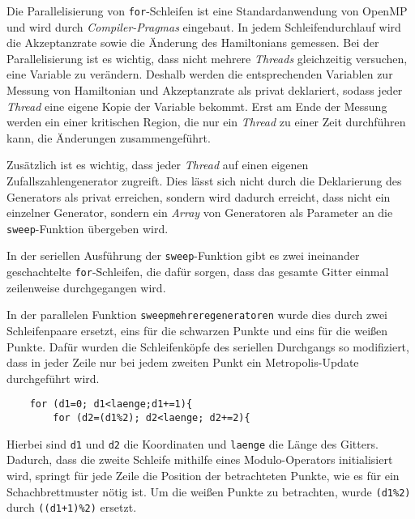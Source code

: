 	Die Parallelisierung von \texttt{for}-Schleifen ist eine Standardanwendung von OpenMP und wird durch \textit{Compiler-Pragmas} eingebaut. In jedem Schleifendurchlauf wird die Akzeptanzrate sowie die Änderung des Hamiltonians gemessen. Bei der Parallelisierung ist es wichtig, dass nicht mehrere \textit{Threads} gleichzeitig versuchen, eine Variable zu verändern. Deshalb werden die entsprechenden Variablen zur Messung von Hamiltonian und Akzeptanzrate als privat deklariert, sodass jeder \textit{Thread} eine eigene Kopie der Variable bekommt. Erst am Ende der Messung werden ein einer kritischen Region, die nur ein \textit{Thread} zu einer Zeit durchführen kann, die Änderungen zusammengeführt. 	%
	
	
	Zusätzlich ist es wichtig, dass jeder \textit{Thread} auf einen eigenen Zufallszahlengenerator zugreift. Dies lässt sich nicht durch die Deklarierung des Generators als privat erreichen, sondern wird dadurch erreicht, dass nicht ein einzelner Generator, sondern ein \textit{Array} von Generatoren als Parameter an die \texttt{sweep}-Funktion übergeben wird.
	
	In der seriellen Ausführung der \texttt{sweep}-Funktion gibt es zwei ineinander geschachtelte \texttt{for}-Schleifen, die dafür sorgen, dass das gesamte Gitter einmal zeilenweise durchgegangen wird.
	
	In der parallelen Funktion \texttt{sweepmehreregeneratoren} wurde dies durch zwei Schleifenpaare ersetzt, eins für die schwarzen Punkte und eins für die weißen Punkte.
	Dafür wurden die Schleifenköpfe des seriellen Durchgangs so modifiziert, dass in jeder Zeile nur bei jedem zweiten Punkt ein Metropolis-Update durchgeführt wird. 
	\begin{verbatim}
	for (d1=0; d1<laenge;d1+=1){
		for (d2=(d1%2); d2<laenge; d2+=2){
	\end{verbatim}
	Hierbei sind \texttt{d1} und \texttt{d2} die Koordinaten und \texttt{laenge} die Länge des Gitters. Dadurch, dass die zweite Schleife mithilfe eines Modulo-Operators initialisiert wird, springt für jede Zeile die Position der betrachteten Punkte, wie es für ein Schachbrettmuster nötig ist. Um die weißen Punkte zu betrachten, wurde \texttt{(d1\%2)} durch \texttt{((d1+1)\%2)} ersetzt.
	
